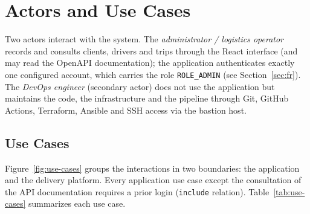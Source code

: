\section{Actors and Use Cases}

Two actors interact with the system. The \emph{administrator / logistics operator} records and consults clients, drivers and trips through the React interface (and may read the OpenAPI documentation); the application authenticates exactly one configured account, which carries the role \texttt{ROLE\_ADMIN} (see Section~\ref{sec:fr}). The \emph{DevOps engineer} (secondary actor) does not use the application but maintains the code, the infrastructure and the pipeline through Git, GitHub Actions, Terraform, Ansible and SSH access via the bastion host.

\subsection{Use Cases}

Figure~\ref{fig:use-cases} groups the interactions in two boundaries: the application and the delivery platform. Every application use case except the consultation of the API documentation requires a prior login (\texttt{include} relation). Table~\ref{tab:use-cases} summarizes each use case.



